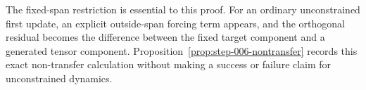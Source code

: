 The fixed-span restriction is essential to this proof.  For an ordinary
unconstrained first update, an explicit outside-span forcing term appears, and
the orthogonal residual becomes the difference between the fixed target
component and a generated tensor component.  Proposition~\ref{prop:step-006-nontransfer}
records this exact non-transfer calculation without making a success or
failure claim for unconstrained dynamics.
